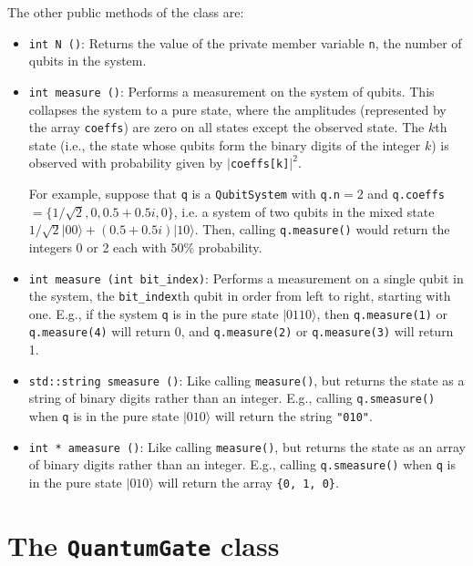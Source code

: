 \documentclass{article}
\begin{document}
The other public methods of the class are: 
\begin{itemize}
\item \verb~int N ()~: Returns the value of the private member variable \verb~n~, the number of qubits in the system. 
\item \verb~int measure ()~: Performs a measurement on the system of qubits. This collapses the system to a pure state, where the amplitudes (represented by the array \verb~coeffs~) are zero on all states except the observed state. The $k$th state (i.e., the state whose qubits form the binary digits of the integer $k$) is observed with probability given by $|$\verb~coeffs[k]~$|^2$. 

For example, suppose that \verb~q~ is a \verb~QubitSystem~ with \verb~q.n~$ = 2$ and \verb~q.coeffs~$ = \{1/\sqrt{2}, 0, 0.5 + 0.5i, 0\}$, i.e. a system of two qubits in the mixed state $1/\sqrt{2}|00\rangle + (0.5+0.5i)|10\rangle$. Then, calling \verb~q.measure()~ would return the integers 0 or 2 each with 50\% probability. 

\item \verb~int measure (int bit_index)~: Performs a measurement on a single qubit in the system, the \verb~bit_index~th qubit in order from left to right, starting with one. E.g., if the system \verb~q~ is in the pure state $|0110\rangle$, then \verb~q.measure(1)~ or \verb~q.measure(4)~ will return 0, and \verb~q.measure(2)~ or \verb~q.measure(3)~ will return 1. 

\item \verb~std::string smeasure ()~: Like calling \verb~measure()~, but returns the state as a string of binary digits rather than an integer. E.g., calling \verb~q.smeasure()~ when \verb~q~ is in the pure state $|010\rangle$ will return the string \verb~"010"~. 

\item \verb~int * ameasure ()~: Like calling \verb~measure()~, but returns the state as an array of binary digits rather than an integer. E.g., calling \verb~q.smeasure()~ when \verb~q~ is in the pure state $|010\rangle$ will return the array \verb~{0, 1, 0}~. 

\end{itemize} 



\section{The \texttt{QuantumGate} class}
\end{document}
